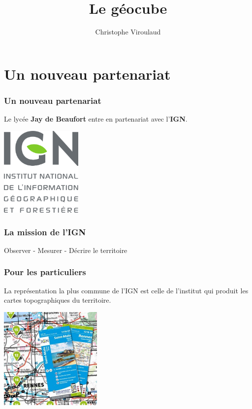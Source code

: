 \documentclass[svgnames,11pt]{beamer}
\author[]{Christophe Viroulaud}
\title{Le géocube}
\date{}
\institute{Seconde - SNT}
\begin{document}
\begin{frame}
\titlepage
\end{frame}
\section{Un nouveau partenariat}
\begin{frame}
    \frametitle{Un nouveau partenariat}

Le lycée \textbf{Jay de Beaufort} entre en partenariat avec l'\textbf{IGN}.
\vspace{1cm}
\begin{center}
\centering
\includegraphics[width=4cm]{ressources/ign.png}
\end{center}
\end{frame}
\begin{frame}
    \frametitle{La mission de l'IGN}

    \begin{center}
        {\Large Observer - Mesurer - Décrire le territoire}
    \end{center}

\end{frame}
\begin{frame}
    \frametitle{Pour les particuliers}
La représentation la plus commune de l'IGN est celle de l'institut qui produit les cartes topographiques du territoire.
    \begin{center}
    \centering
    \includegraphics[width=5cm]{ressources/ign-carte.jpg}
    \label{IMG}
    \end{center}

\end{frame}
\end{document}
